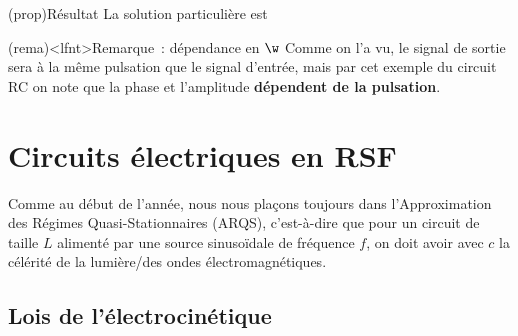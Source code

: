 \documentclass[../../main/main.tex]{subfiles}
\begin{document}
\begin{tcb}(prop){Résultat}
	La solution particulière est
\end{tcb}

\begin{tcb}(rema)<lfnt>{Remarque~: dépendance en $\w$}
	Comme on l'a vu, le signal de sortie sera à la même pulsation que le signal
	d'entrée, mais par cet exemple du circuit RC on note que la phase et
	l'amplitude \textbf{dépendent de la pulsation}.
\end{tcb}


\section{Circuits électriques en RSF}
Comme au début de l'année, nous nous plaçons toujours dans l'Approximation des
Régimes Quasi-Stationnaires (ARQS), c'est-à-dire que pour un circuit de taille
$L$ alimenté par une source sinusoïdale de fréquence $f$, on doit avoir
 avec $c$ la célérité de la lumière/des ondes
électromagnétiques.

\subsection{Lois de l'électrocinétique}
\end{document}
